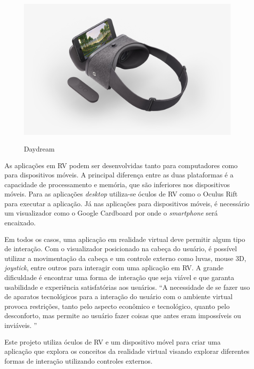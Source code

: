 \begin{figure}[ht]
	\caption{\small Daydream}
	\centering
	\includegraphics[scale=0.15]{Imagens/daydream.jpg}
	\label{f.daydream}
\end{figure}

As aplicações em RV podem ser desenvolvidas tanto para computadores como para dispositivos móveis. A principal diferença entre as duas plataformas é a capacidade de processamento e memória, que são inferiores nos dispositivos móveis. Para as aplicações \textit{desktop} utiliza-se óculos de RV como o Oculus Rift para executar a aplicação. Já nas aplicações para dispositivos móveis, é necessário um visualizador como o Google Cardboard por onde o \textit{smartphone} será encaixado.

Em todos os casos, uma aplicação em realidade virtual deve permitir algum tipo de interação. Com o visualizador posicionado na cabeça do usuário, é possível utilizar a movimentação da cabeça e um controle externo como luvas, mouse 3D, \textit{joystick}, entre outros para interagir com uma aplicação em RV. A grande dificuldade é encontrar uma forma de interação que seja viável e que garanta usabilidade e experiência satisfatórias aos usuários. “A necessidade de se fazer uso de aparatos tecnológicos para a interação do usuário com o ambiente virtual provoca restrições, tanto pelo aspecto econômico e tecnológico, quanto pelo desconforto, mas permite ao usuário fazer coisas que antes eram impossíveis ou inviáveis. ” \cite[p. ~3]{torilivro}

Este projeto utiliza óculos de RV e um dispositivo móvel para criar uma aplicação que explora os conceitos da realidade virtual visando explorar diferentes formas de interação utilizando controles externos.

